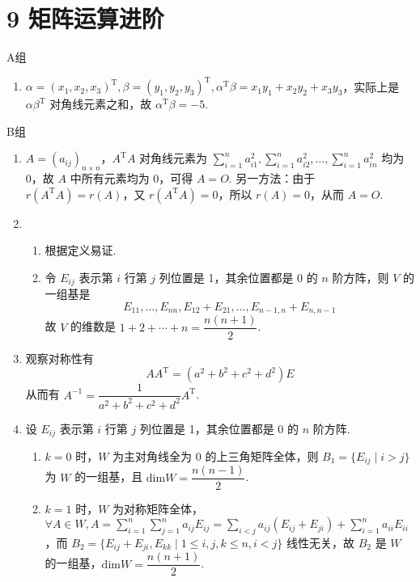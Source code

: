 \section*{9 矩阵运算进阶}

\vspace{2ex}

\centerline{\heiti A组}
\begin{enumerate}
    \item $\alpha = (x_1,x_2,x_3)^{\mathrm{T}},\beta = (y_1,y_2,y_3)^{\mathrm{T}},\alpha^{\mathrm{T}}\beta=x_1y_1+x_2y_2+x_3y_3$，实际上是 $\alpha\beta^{\mathrm{T}}$ 对角线元素之和，故 $\alpha^{\mathrm{T}}\beta=-5$.
\end{enumerate}

\centerline{\heiti B组}
\begin{enumerate}
    \item $A=(a_{ij})_{n\times n}$，$A^\mathrm{T}A$ 对角线元素为 $\displaystyle\sum_{i=1}^na_{i1}^2,\sum_{i=1}^na_{i2}^2,\ldots,\sum_{i=1}^na_{in}^2$ 均为 0，故 $A$ 中所有元素均为 0，可得 $A=O$. 另一方法：由于 $r(A^\mathrm{T}A) = r(A)$，又 $r(A^\mathrm{T}A)=0$，所以 $r(A)=0$，从而 $A=O$.

    \item \begin{enumerate}
              \item 根据定义易证.

              \item 令 $E_{ij}$ 表示第 $i$ 行第 $j$ 列位置是 1，其余位置都是 0 的 $n$ 阶方阵，则 $V$ 的一组基是
                    \[E_{11},\ldots,E_{nn},E_{12}+E_{21},\ldots,E_{n-1,n}+E_{n,n-1}\]
                    故 $V$ 的维数是 $1+2+\cdots+n=\dfrac{n(n+1)}{2}$.
          \end{enumerate}

    \item 观察对称性有
          \[AA^{\mathrm{T}}=(a^2+b^2+c^2+d^2)E\]
          从而有 $A^{-1}=\dfrac{1}{a^2+b^2+c^2+d^2}A^{\mathrm{T}}$.

    \item 设 $E_{ij}$ 表示第 $i$ 行第 $j$ 列位置是 1，其余位置都是 0 的 $n$ 阶方阵.
          \begin{enumerate}
              \item $k=0$ 时，$W$ 为主对角线全为 0 的上三角矩阵全体，则 $B_1=\{E_{ij} \mid i>j\}$ 为 $W$ 的一组基，且 $\mathrm{dim}W=\dfrac{n(n-1)}{2}$.

              \item $k=1$ 时，$W$ 为对称矩阵全体，$\forall A\in W,A = \displaystyle\sum_{i=1}^n\sum_{j=1}^na_{ij}E_{ij}=\sum_{i<j}a_{ij}(E_{ij}+E_{ji})+\sum_{i=1}^na_{ii}E_{ii}$，而 $B_2=\{E_{ij}+E_{ji},E_{kk} \mid 1\leq i,j,k\leq n,i<j\}$ 线性无关，故 $B_2$ 是 $W$ 的一组基，$\mathrm{dim}W=\dfrac{n(n+1)}{2}$.


\end{enumerate}
\end{enumerate}
